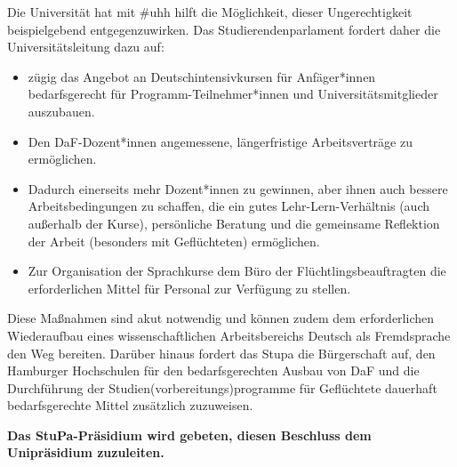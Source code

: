 \documentclass[ngerman,headheight=70pt]{scrartcl}
\begin{document}
    Die Universität hat mit \#uhh hilft die Möglichkeit, dieser Ungerechtigkeit
    beispielgebend entgegenzuwirken. Das Studierendenparlament fordert daher die
    Universitätsleitung dazu auf:

    \begin{itemize}
        \item zügig das Angebot an Deutschintensivkursen für Anfäger*innen
        bedarfsgerecht für Programm-Teilnehmer*innen und Universitätsmitglieder
        auszubauen.
        \item Den DaF-Dozent*innen angemessene, längerfristige Arbeitsverträge
        zu ermöglichen.
        \item Dadurch einerseits mehr Dozent*innen zu gewinnen, aber ihnen auch
        bessere Arbeitsbedingungen zu schaffen, die ein gutes Lehr-Lern-Verhältnis
        (auch außerhalb der Kurse), persönliche Beratung und die gemeinsame
        Reflektion der Arbeit (besonders mit Geflüchteten) ermöglichen.
        \item Zur Organisation der Sprachkurse dem Büro der Flüchtlingsbeauftragten
        die erforderlichen Mittel für Personal zur Verfügung zu stellen.
    \end{itemize}

    Diese Maßnahmen sind akut notwendig und können zudem dem erforderlichen
    Wiederaufbau eines wissenschaftlichen Arbeitsbereichs Deutsch als Fremdsprache
    den Weg bereiten.
    Darüber hinaus fordert das Stupa die Bürgerschaft auf, den Hamburger
    Hochschulen für den bedarfsgerechten Ausbau von DaF und die Durchführung der
    Studien(vorbereitungs)programme für Geflüchtete dauerhaft bedarfsgerechte Mittel
    zusätzlich zuzuweisen.

    \textbf{Das StuPa-Präsidium wird gebeten, diesen Beschluss dem Unipräsidium
    zuzuleiten.}
\end{document}

